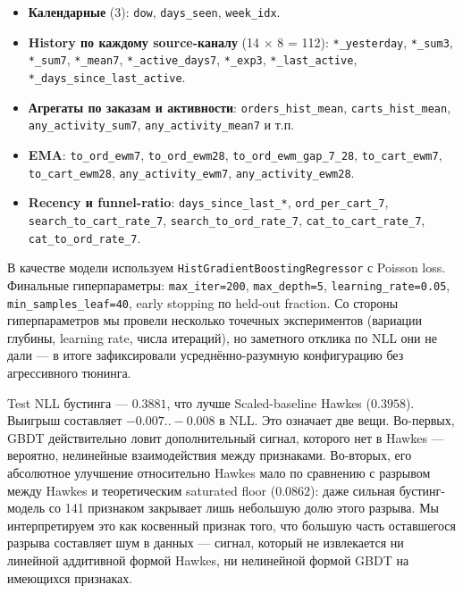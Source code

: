 \documentclass[12pt,a4paper]{article}
\begin{document}
\begin{itemize}
  \item \textbf{Календарные} (3): \texttt{dow}, \texttt{days\_seen}, \texttt{week\_idx}.
  \item \textbf{History по каждому source-каналу} (14 $\times$ 8 = 112): \texttt{*\_yesterday}, \texttt{*\_sum3}, \texttt{*\_sum7}, \texttt{*\_mean7}, \texttt{*\_active\_days7}, \texttt{*\_exp3}, \texttt{*\_last\_active}, \texttt{*\_days\_since\_last\_active}.
  \item \textbf{Агрегаты по заказам и активности}: \texttt{orders\_hist\_mean}, \texttt{carts\_hist\_mean}, \texttt{any\_activity\_sum7}, \texttt{any\_activity\_mean7} и т.п.
  \item \textbf{EMA}: \texttt{to\_ord\_ewm7}, \texttt{to\_ord\_ewm28}, \texttt{to\_ord\_ewm\_gap\_7\_28}, \texttt{to\_cart\_ewm7}, \texttt{to\_cart\_ewm28}, \texttt{any\_activity\_ewm7}, \texttt{any\_activity\_ewm28}.
  \item \textbf{Recency и funnel-ratio}: \texttt{days\_since\_last\_*}, \texttt{ord\_per\_cart\_7}, \texttt{search\_to\_cart\_rate\_7}, \texttt{search\_to\_ord\_rate\_7}, \texttt{cat\_to\_cart\_rate\_7}, \texttt{cat\_to\_ord\_rate\_7}.
\end{itemize}


В качестве модели используем \texttt{HistGradientBoostingRegressor} с Poisson loss. Финальные гиперпараметры: \texttt{max\_iter=200}, \texttt{max\_depth=5}, \texttt{learning\_rate=0.05}, \texttt{min\_samples\_leaf=40}, early stopping по held-out fraction. Со стороны гиперпараметров мы провели несколько точечных экспериментов (вариации глубины, learning rate, числа итераций), но заметного отклика по NLL они не дали --- в итоге зафиксировали усреднённо-разумную конфигурацию без агрессивного тюнинга.

Test NLL бустинга --- $0.3881$, что лучше Scaled-baseline Hawkes ($0.3958$). Выигрыш составляет $-0.007..-0.008$ в NLL. Это означает две вещи. Во-первых, GBDT действительно ловит дополнительный сигнал, которого нет в Hawkes --- вероятно, нелинейные взаимодействия между признаками. Во-вторых, его абсолютное улучшение относительно Hawkes мало по сравнению с разрывом между Hawkes и теоретическим saturated floor ($0.0862$): даже сильная бустинг-модель со 141 признаком закрывает лишь небольшую долю этого разрыва. Мы интерпретируем это как косвенный признак того, что большую часть оставшегося разрыва составляет шум в данных --- сигнал, который не извлекается ни линейной аддитивной формой Hawkes, ни нелинейной формой GBDT на имеющихся признаках.
\end{document}
